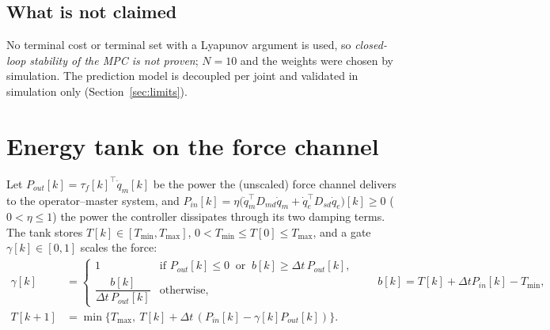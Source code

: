 \documentclass[11pt,a4paper]{article}
\theoremstyle{remark}
\theoremstyle{definition}
\begin{document}
\subsection{What is not claimed}
No terminal cost or terminal set with a Lyapunov argument is used, so \emph{closed-loop stability of the MPC is not proven}; $N=10$ and the weights were chosen by simulation. The prediction model is decoupled per joint and validated in simulation only (Section~\ref{sec:limits}).

\section{Energy tank on the force channel}\label{sec:tank}
Let $P_{out}[k]=\tau_f[k]^\top\dot q_m[k]$ be the power the (unscaled) force channel delivers to the operator--master system, and
$P_{in}[k]=\eta\big(\dot q_m^\top D_{md}\dot q_m+\dot q_e^\top D_{sd}\dot q_e\big)[k]\ge0$ ($0<\eta\le1$) the power the controller dissipates through its two damping terms. The tank stores
$T[k]\in[T_{\min},T_{\max}]$, $0<T_{\min}\le T[0]\le T_{\max}$, and a gate $\gamma[k]\in[0,1]$ scales the force:
\begin{align}
\gamma[k]&=\begin{cases}1&\text{if }P_{out}[k]\le0\ \text{ or }\ b[k]\ge\Delta t\,P_{out}[k],\\[2pt]\dfrac{b[k]}{\Delta t\,P_{out}[k]}&\text{otherwise,}\end{cases}\qquad b[k]=T[k]+\Delta tP_{in}[k]-T_{\min},\label{eq:gamma}\\
T[k+1]&=\min\big\{T_{\max},\ T[k]+\Delta t\,(P_{in}[k]-\gamma[k]P_{out}[k])\big\}.\label{eq:tank}
\end{align}
\end{document}
